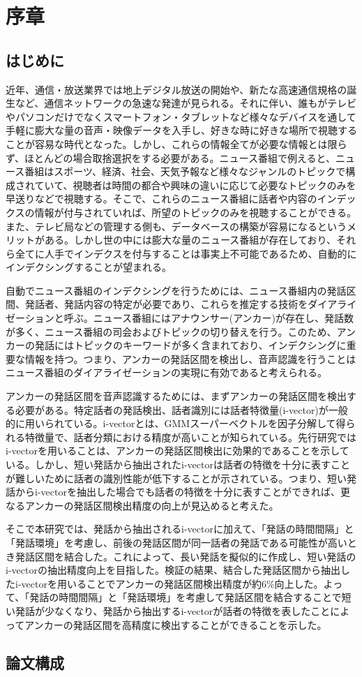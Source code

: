 \chapter{序章}
\section{はじめに}
近年、通信・放送業界では地上デジタル放送の開始や、新たな高速通信規格の誕生など、通信ネットワークの急速な発達が見られる。それに伴い、誰もがテレビやパソコンだけでなくスマートフォン・タブレットなど様々なデバイスを通して手軽に膨大な量の音声・映像データを入手し、好きな時に好きな場所で視聴することが容易な時代となった。しかし、これらの情報全てが必要な情報とは限らず、ほとんどの場合取捨選択をする必要がある。ニュース番組で例えると、ニュース番組はスポーツ、経済、社会、天気予報など様々なジャンルのトピックで構成されていて、視聴者は時間の都合や興味の違いに応じて必要なトピックのみを早送りなどで視聴する。そこで、これらのニュース番組に話者や内容のインデックスの情報が付与されていれば、所望のトピックのみを視聴することができる。また、テレビ局などの管理する側も、データベースの構築が容易になるというメリットがある。しかし世の中には膨大な量のニュース番組が存在しており、それら全てに人手でインデクスを付与することは事実上不可能であるため、自動的にインデクシングすることが望まれる。\par
自動でニュース番組のインデクシングを行うためには、ニュース番組内の発話区間、発話者、発話内容の特定が必要であり、これらを推定する技術をダイアライゼーションと呼ぶ。ニュース番組にはアナウンサー(アンカー)が存在し、発話数が多く、ニュース番組の司会およびトピックの切り替えを行う。このため、アンカーの発話にはトピックのキーワードが多く含まれており、インデクシングに重要な情報を持つ。つまり、アンカーの発話区間を検出し、音声認識を行うことはニュース番組のダイアライゼーションの実現に有効であると考えられる。\par
アンカーの発話区間を音声認識するためには、まずアンカーの発話区間を検出する必要がある。特定話者の発話検出、話者識別には話者特徴量(i-vector)が一般的に用いられている\cite{ogawa_ivector}\cite{nishi_multi}。i-vectorとは、GMMスーパーベクトルを因子分解して得られる特徴量で、話者分類における精度が高いことが知られている。先行研究\cite{nozaki_gakuseikai}ではi-vectorを用いることは、アンカーの発話区間検出に効果的であることを示している。しかし、短い発話から抽出されたi-vectorは話者の特徴を十分に表すことが難しいために話者の識別性能が低下することが示されている\cite{panaiv}。つまり、短い発話からi-vectorを抽出した場合でも話者の特徴を十分に表すことができれば、更なるアンカーの発話区間検出精度の向上が見込めると考えた。\par
そこで本研究では、発話から抽出されるi-vectorに加えて、「発話の時間間隔」と「発話環境」を考慮し、前後の発話区間が同一話者の発話である可能性が高いとき発話区間を結合した。これによって、長い発話を擬似的に作成し、短い発話のi-vectorの抽出精度向上を目指した。検証の結果、結合した発話区間から抽出したi-vectorを用いることでアンカーの発話区間検出精度が約6\%向上した。よって、「発話の時間間隔」と「発話環境」を考慮して発話区間を結合することで短い発話が少なくなり、発話から抽出するi-vectorが話者の特徴を表したことによってアンカーの発話区間を高精度に検出することができることを示した。

\section{論文構成}
